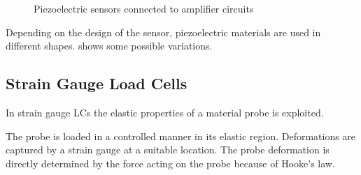\begin{figure}[!htb]
    \centering
    \hspace{4em}
    \caption[Piezoelectric sensors in amplifier circuits \cite{webster2018measurement}]{Piezoelectric sensors connected to amplifier circuits \cite{webster2018measurement}}
    \label{fig:piezo_ampcirc}
\end{figure}

Depending on the design of the sensor, piezoelectric materials are used in different shapes.  shows some possible variations.


\subsection{Strain Gauge Load Cells}

In strain gauge \ac{LC}s the elastic properties of a material probe is exploited.

The probe is loaded in a controlled manner in its elastic region. Deformations are captured by a strain gauge at a suitable location. The probe deformation is directly determined by the force acting on the probe because of Hooke's law.

